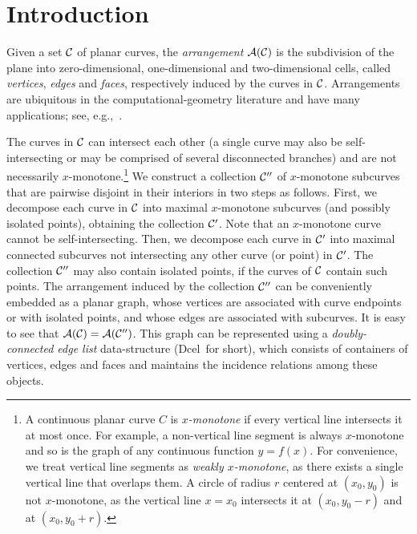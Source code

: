 \lcTex{%
  \newlength{\widthExtra}\setlength{\widthExtra}{1.1cm}
  \newlength{\widthLineReal}\setlength{\widthLineReal}{\linewidth}
  \addtolength{\widthLineReal}{-\widthExtra}
  \newlength{\minipageSpace}\setlength{\minipageSpace}{0.2cm}

  \newlength{\widthLeft}
  \newlength{\widthRight}
}

\newcommand{\reals}{{\rm I\!\hspace{-0.025em} R}}
\newcommand{\calC}{{\cal C}}
\newcommand{\calA}{{\cal A}}
\newcommand{\eps}{{\varepsilon}}
\newcommand{\dcel}{{\sc Dcel}}
\newcommand{\naive}{na\"{\i}ve}
\newcommand{\kdtree}{{\sc Kd}-tree}
\newcommand{\boost}{{\sc Boost}}
\newcommand{\bgl}{{\sc Bgl}}
\newcommand{\Cpp}{{C}{\tt ++}}

\section{Introduction}
\label{arr_sec:intro}
%
Given a set $\calC$ of planar curves, the {\em arrangement}
$\calA(\calC)$ is the subdivision of the plane into zero-dimensional,
one-dimensional and two-dimensional cells, called {\em vertices}, {\em
edges} and {\em faces}, respectively induced by the curves in $\calC$.
Arrangements are ubiquitous in the computational-geometry
literature and have many applications;
see, e.g.,~\cite{as-aa-00,cgal:h-a-04}.

The curves in $\calC$ can intersect each other (a single curve may also
be self-intersecting or may be comprised of several disconnected branches)
and are not necessarily $x$-monotone.\footnote{A continuous planar curve $C$
is {\em $x$-monotone} if every vertical line intersects it at
most once. For example, a non-vertical line segment is always
$x$-monotone and so is the graph of any continuous function $y = f(x)$.
For convenience, we treat vertical line segments as {\em weakly
$x$-monotone}, as there exists a single vertical line that overlaps them.
A circle of radius $r$ centered at $(x_0, y_0)$ is not $x$-monotone, as
the vertical line $x = x_0$ intersects it at $(x_0, y_0 - r)$ and at
$(x_0, y_0 + r)$.}
We construct a collection $\calC''$ of
$x$-monotone subcurves that are pairwise disjoint in their interiors
in two steps as follows. First, we decompose each curve in $\calC$
into maximal $x$-monotone subcurves (and possibly isolated points),
obtaining the collection $\calC'$. Note that an $x$-monotone curve cannot
be self-intersecting. Then, we decompose each curve in $\calC'$ into
maximal connected subcurves not intersecting any other
curve (or point) in $\calC'$. The collection $\calC''$ may also
contain isolated points, if the curves of $\calC$ contain such
points. The arrangement induced by the collection $\calC''$ can be
conveniently embedded as a planar graph, whose vertices are associated
with curve endpoints or with isolated points, and whose edges are
associated with subcurves. It is easy to see that
$\calA(\calC) = \calA(\calC'')$. This graph can be represented using a
{\em doubly-connected edge list} data-structure (\dcel\ for short),
which consists of containers of vertices, edges and faces and
maintains the incidence relations among these objects.

